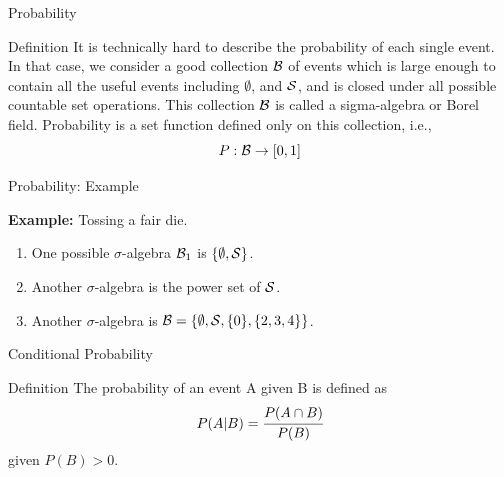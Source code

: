\documentclass[aspectratio=169,xcolor=dvipsnames,svgnames,x11names,fleqn]{beamer}
\begin{document}
    
    \begin{frame}[containsverbatim]{Probability}
        \begin{tblock}{Definition}
       It is technically hard to describe the probability of each single event. In that case, we consider a good collection ${\mathcal B}$ of events which is large enough to contain all the useful events including $\emptyset$, and ${\mathcal S}$, and is closed under all possible countable set operations. This collection ${\mathcal B}$ is called a sigma-algebra or Borel field. Probability is a set function defined only on this collection, i.e.,
       $$
       P: {\mathcal B} \rightarrow [0, 1]
       $$
       
        \end{tblock}
    \end{frame}

    \begin{frame}{Probability: Example}

        \textbf{Example:} Tossing a fair die.
    
       \begin{enumerate}
           \item One possible $\sigma$-algebra ${\mathcal B}_1$ is $\{ \emptyset, {\mathcal S}\}$.
           \item Another $\sigma$-algebra is the power set of ${\mathcal S}$.
           \item Another $\sigma$-algebra is ${\mathcal B} = \{\emptyset, {\mathcal S}, \{0\}, \{2, 3, 4\}\}$.
       \end{enumerate}
        
    \end{frame}
    
    
    \begin{frame}[containsverbatim]{Conditional Probability}
        \begin{tblock}{Definition}
            The probability of an event A given B is defined as
            \begin{equation}
                P(A|B) = \cfrac{P(A \cap B )}{P(B)}
            \end{equation}
            given $P(B) > 0$.
        \end{tblock}
    \end{frame}
\end{document}

